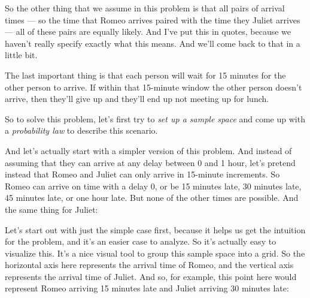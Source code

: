 \documentclass[pdftex, brazil, 12pt, twoside]{article}
\begin{document}
So the other thing that we assume in this problem is that
all pairs of arrival times --- so the time that Romeo arrives
paired with the time they Juliet arrives ---
all of these pairs are equally likely.
And I've put this in quotes, because we haven't really
specify exactly what this means.
And we'll come back to that in a little bit.

The last important thing is that each person will wait for
15 minutes for the other person to arrive.
If within that 15-minute window the other person
doesn't arrive, then they'll give up and they'll end up not
meeting up for lunch.

So to solve this problem, let's first try to \emph{set up a
sample space} and come up with a \emph{probability law} to describe
this scenario.

And let's actually start with a simpler
version of this problem.
And instead of assuming that they can arrive at any delay
between 0 and 1 hour, let's pretend instead that Romeo and
Juliet can only arrive in 15-minute increments.
So Romeo can arrive on time with a delay 0, or be 15
minutes late, 30 minutes late, 45 minutes
late, or one hour late.
But none of the other times are possible.
And the same thing for Juliet:

\begin{figure}[H]
  \begin{center}
  \end{center}
\end{figure}

Let's start out with just the simple case first, because it
helps us get the intuition for the problem, and it's an
easier case to analyze.
So it's actually easy to visualize this.
It's a nice visual tool to group this sample
space into a grid.
So the horizontal axis here represents the arrival time of
Romeo, and the vertical axis represents the
arrival time of Juliet.
And so, for example, this point here would represent
Romeo arriving 15 minutes late and Juliet
arriving 30 minutes late:
\end{document}

